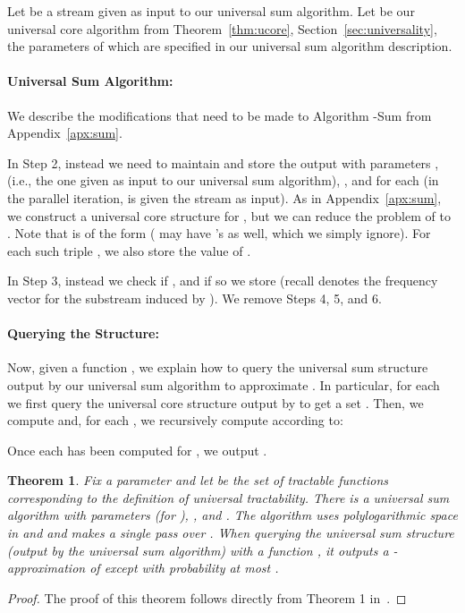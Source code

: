 \documentclass[11pt]{article}
\newtheorem{thm}{Theorem}
\begin{document}
Let  be a stream given as input to our universal sum algorithm.
Let  be our universal core algorithm from Theorem~\ref{thm:ucore}, Section~\ref{sec:universality},
the parameters of which are specified in our universal sum algorithm description.

\paragraph{Universal Sum Algorithm:} We describe the modifications that need to be made to Algorithm
-Sum from Appendix~\ref{apx:sum}.

In Step 2, instead we need to maintain and store the
output  with parameters ,  (i.e., the one
given as input to our universal sum algorithm), , and
 for each  (in the  parallel iteration,  is
given the stream  as input).  As in Appendix~\ref{apx:sum}, we construct a universal core
structure for , but we can reduce the problem of  to .
Note that  is of the form  ( may have 's as well,
which we simply ignore).  For each such triple , we also store the value of .

In Step 3, instead we check if , and if so we store  (recall 
denotes the frequency vector  for the substream  induced by ).  We remove Steps
4, 5, and 6.

\paragraph{Querying the Structure:} Now, given a function , we explain how to query
the universal sum structure output by our universal sum algorithm to approximate .  In particular, for each  we first
query the universal core structure output by  to get a set .
Then, we compute  and, for each , we recursively compute
 according to:



\noindent Once each  has been computed for , we output .

\begin{thm}
Fix a parameter  and let  be the set of tractable functions corresponding to the
definition of universal tractability.  There is a universal sum algorithm with parameters
 (for ), ,
and .  The algorithm uses polylogarithmic space in  and  and makes a single
pass over .  When querying the universal sum structure (output by the universal sum algorithm)
with a function , it outputs a -approximation of  except
with probability at most .
\end{thm}

\begin{proof}
The proof of this theorem follows directly from Theorem 1 in~\cite{BO13}.
\end{proof}
\end{document}
